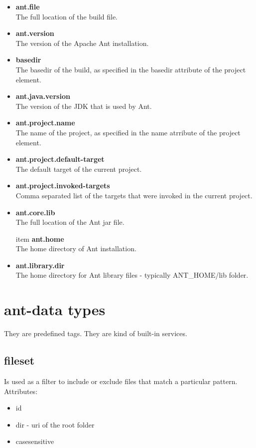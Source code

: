 \documentclass{report}
\begin{document}
\begin{itemize}
  \item \textbf{ant.file}\\
The full location of the build file.

	\item \textbf{ant.version}\\
The version of the Apache Ant installation.

	\item \textbf{basedir}\\
The basedir of the build, as specified in the basedir attribute of the project element.

	\item \textbf{ant.java.version}\\
The version of the JDK that is used by Ant.

	\item \textbf{ant.project.name}\\
The name of the project, as specified in the name atrribute of the project element.

	\item \textbf{ant.project.default-target}\\
The default target of the current project.

	\item \textbf{ant.project.invoked-targets}\\
Comma separated list of the targets that were invoked in the current project.

	\item \textbf{ant.core.lib}\\
The full location of the Ant jar file.

	item \textbf{ant.home}\\
The home directory of Ant installation.

	\item \textbf{ant.library.dir}\\
The home directory for Ant library files - typically ANT\_HOME/lib folder.

\end{itemize}


\section{ant-data types}
They are predefined tags. They are kind of built-in services.

\subsection{fileset}
Is used as a filter to include or exclude files that match a particular pattern.
Attributes:
\begin{itemize}
  \item id
  \item dir - uri of the root folder
  \item casesensitive
\end{itemize}
\end{document}
